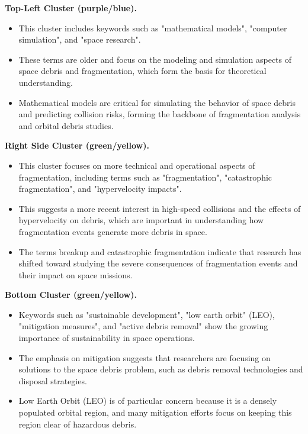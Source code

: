 \documentclass[journal ]{new-aiaa}
\begin{document}
\textbf{Top-Left Cluster (purple/blue).}

\begin{itemize}
    \item This cluster includes keywords such as "mathematical models", "computer simulation", and "space research".
    \item These terms are older and focus on the modeling and simulation aspects of space debris and fragmentation, which form the basis for theoretical understanding.
    \item Mathematical models are critical for simulating the behavior of space debris and predicting collision risks, forming the backbone of fragmentation analysis and orbital debris studies.
\end{itemize}

\textbf{Right Side Cluster (green/yellow).}

\begin{itemize}
    \item This cluster focuses on more technical and operational aspects of fragmentation, including terms such as "fragmentation", "catastrophic fragmentation", and "hypervelocity impacts".
    \item This suggests a more recent interest in high-speed collisions and the effects of hypervelocity on debris, which are important in understanding how fragmentation events generate more debris in space.
    \item The terms breakup and catastrophic fragmentation indicate that research has shifted toward studying the severe consequences of fragmentation events and their impact on space missions.
\end{itemize}

\textbf{Bottom Cluster (green/yellow).}

\begin{itemize}
    \item Keywords such as "sustainable development", "low earth orbit" (LEO), "mitigation measures", and "active debris removal" show the growing importance of sustainability in space operations.
    \item The emphasis on mitigation suggests that researchers are focusing on solutions to the space debris problem, such as debris removal technologies and disposal strategies.
    \item Low Earth Orbit (LEO) is of particular concern because it is a densely populated orbital region, and many mitigation efforts focus on keeping this region clear of hazardous debris.
\end{itemize}
\end{document}
